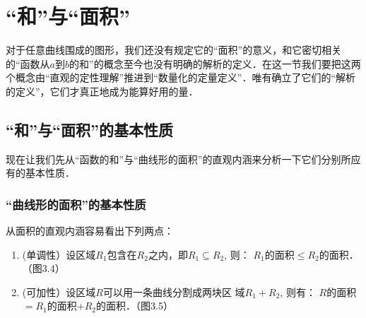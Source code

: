 \section{“和”与“面积”}
对于任意曲线围成的图形，我们还没有规定它的“面积”的意义，和它密切相关的“函数从$a$到$b$的和”的概念至今也没有明确的解析的定义．在这一节我们要把这两个概念由“直观的定性理解”推进到“数量化的定量定义”．唯有确立了它们的“解析的定义”，它们才真正地成为能算好用的量．

\subsection{“和”与“面积”的基本性质}
现在让我们先从“函数的和”与“曲线形的面积”的直观内涵来分析一下它们分别所应有的基本性质．

\subsubsection{“曲线形的面积”的基本性质}

从面积的直观内涵容易看出下列两点：
\begin{enumerate}
\item (单调性）设区域$R_1$包含在$R_2$之内，即$R_1\subseteq R_2$, 则：
$R_1$的面积$\le R_2$的面积．（图3.4）
\item (可加性）设区域$R$可以用一条曲线分割成两块区
域$R_1+R_2$, 则有：
$R$的面积$=R_1$的面积$+R_2$的面积．（图3.5）
\end{enumerate}

\begin{figure}[htp]
    \centering
    \begin{minipage}[t]{0.48\textwidth}
    \centering
    \caption{}
    \end{minipage}
    \begin{minipage}[t]{0.48\textwidth}
    \centering
    \caption{}
    \end{minipage}
\end{figure}

